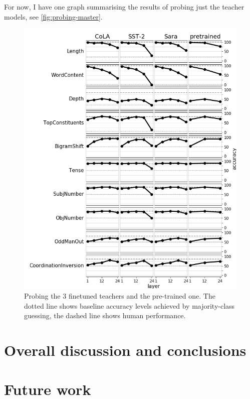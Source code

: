 \documentclass[bsc,frontabs,twoside,singlespacing,parskip,deptreport]{infthesis}
\begin{document}
{{    For now, I have one graph summarising the results of probing just the teacher models, see \autoref{fig:probing-master}.
    \begin{figure}[h!t]
      \centering
      \includegraphics[width=12.5cm]{graphics/probing_master.png}
      \caption{Probing the 3 finetuned teachers and the pre-trained one. The dotted line shows baseline accuracy levels achieved by majority-class guessing, the dashed line shows human performance.}
      \label{fig:probing-master}
    \end{figure}
  }
}

\chapter{Overall discussion and conclusions}{}

\chapter{Future work}{}
\end{document}
